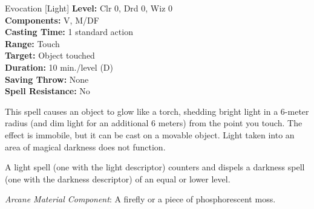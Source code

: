 {Evocation [Light]}
{
	\textbf{Level:}
	Clr 0, Drd 0, Wiz 0\\
	\textbf{Components:}
	V, M/DF\\
	\textbf{Casting Time:}
	1 standard action\\
	\textbf{Range:}
	Touch\\
	\textbf{Target:}
	Object touched\\
	\textbf{Duration:}
	10 min./level (D)\\
	\textbf{Saving Throw:}
	None\\
	\textbf{Spell Resistance:}
	No\\
}
{
	This spell causes an object to glow like a torch, shedding bright light in a 6-meter radius (and dim light for an additional 6 meters) from the point you touch. The effect is immobile, but it can be cast on a movable object. Light taken into an area of magical darkness does not function.

	A light spell (one with the light descriptor) counters and dispels a darkness spell (one with the darkness descriptor) of an equal or lower level.

	\textit{Arcane Material Component}:
	A firefly or a piece of phosphorescent moss.

}
